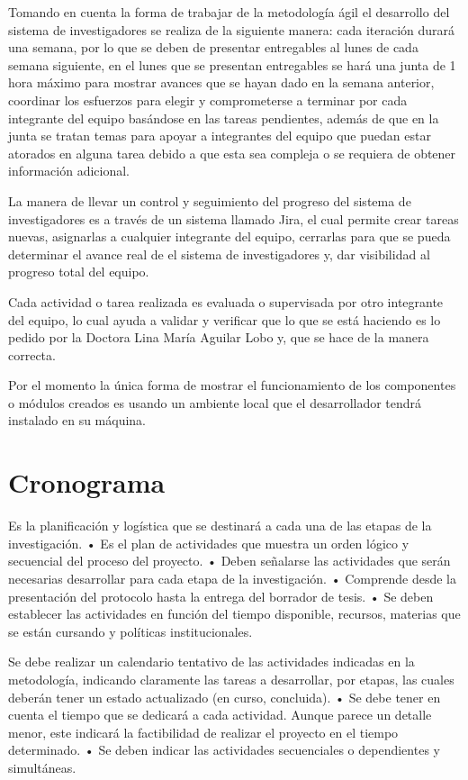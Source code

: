     Tomando en cuenta la forma de trabajar de la metodología ágil el desarrollo del sistema de investigadores se realiza de la siguiente manera: cada iteración durará una semana, por lo que se deben de presentar entregables al lunes de cada semana siguiente, en el lunes que se presentan entregables se hará una junta de 1 hora máximo para mostrar avances que se hayan dado en la semana anterior, coordinar los esfuerzos para elegir y comprometerse a terminar por cada integrante del equipo basándose en las tareas pendientes, además de que en la junta se tratan temas para apoyar a integrantes del equipo que puedan estar atorados en alguna tarea debido a que esta sea compleja o se requiera de obtener información adicional.
    
    La manera de llevar un control y seguimiento del progreso del sistema de investigadores es a través de un sistema llamado Jira, el cual permite crear tareas nuevas, asignarlas a cualquier integrante del equipo, cerrarlas para que se pueda determinar el avance real de el sistema de investigadores y, dar visibilidad al progreso total del equipo.
    
    Cada actividad o tarea realizada es evaluada o supervisada por otro integrante del equipo, lo cual ayuda a validar y verificar que lo que se está haciendo es lo pedido por la Doctora Lina María Aguilar Lobo y, que se hace de la manera correcta.
    
    Por el momento la única forma de mostrar el funcionamiento de los componentes o módulos creados es usando un ambiente local que el desarrollador tendrá instalado en su máquina.

\section{Cronograma}
Es la planificación y logística que se destinará a cada una
de las etapas de la investigación.
• Es el plan de actividades que muestra un orden lógico y
secuencial del proceso del proyecto.
• Deben señalarse las actividades que serán necesarias
desarrollar para cada etapa de la investigación.
• Comprende desde la presentación del protocolo hasta la
entrega del borrador de tesis.
• Se deben establecer las actividades en función del tiempo
disponible, recursos, materias que se están cursando y
políticas institucionales.

Se debe realizar un calendario tentativo de las actividades
indicadas en la metodología, indicando claramente las
tareas a desarrollar, por etapas, las cuales deberán tener un
estado actualizado (en curso, concluida).
• Se debe tener en cuenta el tiempo que se dedicará a cada
actividad. Aunque parece un detalle menor, este indicará la
factibilidad de realizar el proyecto en el tiempo determinado.
• Se deben indicar las actividades secuenciales o
dependientes y simultáneas.

